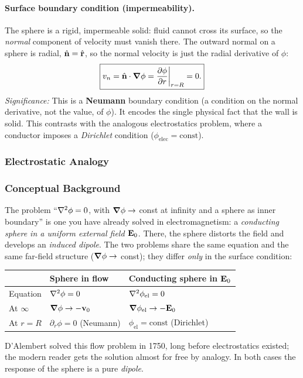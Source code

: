 \documentclass[../main.tex]{subfiles}
\begin{document}
\paragraph{Surface boundary condition (impermeability).}
The sphere is a rigid, impermeable solid: fluid cannot cross its surface, so the \emph{normal} component of velocity must vanish there. The outward normal on a sphere is radial, $\hat{\mathbf{n}}=\hat{\mathbf{r}}$, so the normal velocity is just the radial derivative of $\phi$:
\begin{equation}
  \boxed{v_n = \hat{\mathbf{n}}\cdot\grad\phi = \pdv{\phi}{r}\bigg|_{r=R} = 0.}
  \label{eq:lec16_bc_neumann}
\end{equation}
\textit{Significance:} This is a \textbf{Neumann} boundary condition (a condition on the normal derivative, not the value, of $\phi$). It encodes the single physical fact that the wall is solid. This contrasts with the analogous electrostatics problem, where a conductor imposes a \emph{Dirichlet} condition ($\phi_{\text{elec}}=\text{const}$).

\subsubsection{Electrostatic Analogy}

\subsubsection*{Conceptual Background}
The problem ``$\nabla^2\phi=0$, with $\grad\phi\to$ const at infinity and a sphere as inner boundary'' is one you have already solved in electromagnetism: a \emph{conducting sphere in a uniform external field $\mathbf{E}_0$}. There, the sphere distorts the field and develops an \emph{induced dipole}. The two problems share the same equation and the same far-field structure ($\grad\phi\to$ const); they differ \emph{only} in the surface condition:
\begin{center}
\begin{tabular}{lll}
  \toprule
  & Sphere in flow & Conducting sphere in $\mathbf{E}_0$ \\
  \midrule
  Equation & $\nabla^2\phi=0$ & $\nabla^2\phi_{\text{el}}=0$ \\
  At $\infty$ & $\grad\phi\to-\mathbf{v}_0$ & $\grad\phi_{\text{el}}\to-\mathbf{E}_0$ \\
  At $r=R$ & $\partial_r\phi=0$ (Neumann) & $\phi_{\text{el}}=\text{const}$ (Dirichlet) \\
  \bottomrule
\end{tabular}
\end{center}
D'Alembert solved this flow problem in 1750, long before electrostatics existed; the modern reader gets the solution almost for free by analogy. In both cases the response of the sphere is a pure \emph{dipole}.
\end{document}
